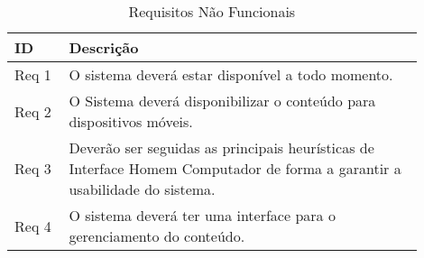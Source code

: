 \begin{table}[H]
\centering
\caption{Requisitos Não Funcionais}
\label{tab:requisitos_nao_funcionais}

\begin{tabular}{|C{0.12\linewidth}|C{0.78\linewidth}|}
\hline
\bfseries ID    & \bfseries Descrição                                           \\ \hline
Req 1 & O sistema deverá estar disponível a todo momento. \\ \hline
Req 2 & O Sistema deverá disponibilizar o conteúdo para dispositivos móveis.   \\ \hline
Req 3 & Deverão ser seguidas as principais heurísticas de Interface Homem Computador de forma a garantir a usabilidade do sistema.        \\ \hline
Req 4 & O sistema deverá ter uma interface para o gerenciamento do conteúdo.  \\ \hline

\end{tabular}

{}
\end{table}